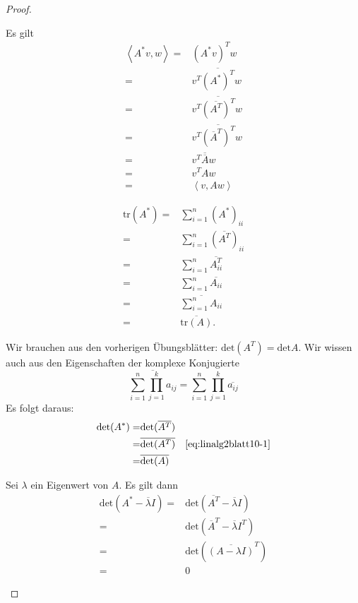 \begin{proof}
\begin{parts}
\item Es gilt
	\begin{align*}
		\left<A^*v,w \right> =& (A^* v)^Tw\\
		=&v^T \overline{(A^*)^T}w\\
		=&v^T \overline{(\overline{A^T})^T}w\\
		=& v^T \overline{(\overline{A}^T)^T}w\\
		=& v^T\overline{\overline{A}}w\\
		=& v^TAw\\
		=&\left<v,Aw \right>
	\end{align*}
\item 
	\begin{align*}
		\text{tr}(A^*)=&\sum_{i=1}^n (A^*)_{ii}\\
		=&\sum_{i=1}^n (\overline{A^T})_{ii}\\
		=&\sum_{i=1}^n \overline{A^T_{ii}}\\
		=&\sum_{i=1}^n \overline{A_{ii}}\\
		=&\overline{\sum_{i=1}^n A_{ii}}\\
		=& \overline{\text{tr}(A)}.
	\end{align*}
\item Wir brauchen aus den vorherigen Übungsblätter: $\text{det}(A^T)=\text{det}A$. Wir wissen auch aus den Eigenschaften der komplexe Konjugierte
\begin{equation}\label{eq:linalg2blatt10-1}
	\overline{\sum_{i=1}^n\prod_{j=1}^k a_{ij}}=\sum_{i=1}^n\prod_{j=1}^k \overline{a_{ij}}	
\end{equation}
	Es folgt daraus:
	\begin{align*}
		\text{det}(A^*)=&\text{det}(\overline{A^T})\\
		=&\overline{\text{det}(A^T)} & \eqref{eq:linalg2blatt10-1}\\
		=& \overline{\text{det}(A)}
	\end{align*}
\item 
	Sei $\lambda$ ein Eigenwert von $A$. Es gilt dann
	\begin{align*}
		\text{det}(A^*-\overline{\lambda} I)=&\text{det}(\overline{A^T}-\overline{\lambda} I)\\
		=& \text{det}(\overline{A}^T-\overline{\lambda}I^T)\\
		=&\text{det}(\overline{(A-\lambda I)}^T)\\
		=& 0
	\end{align*}

\end{parts}
\end{proof}
